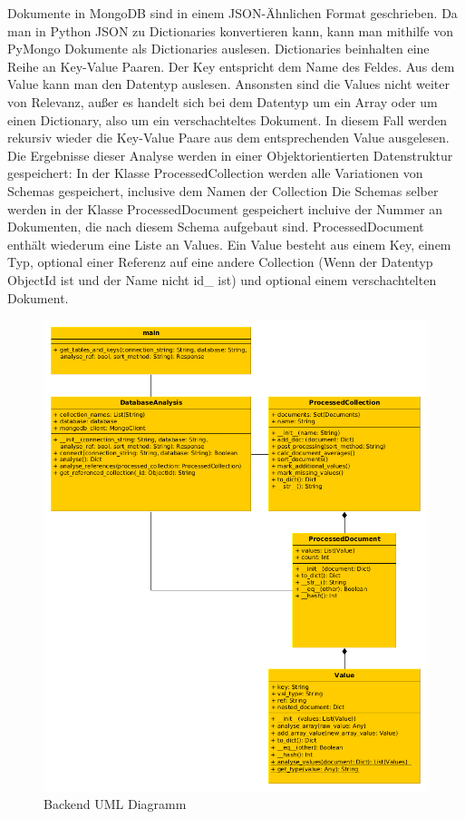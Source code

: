Dokumente in MongoDB sind in einem JSON-Ähnlichen Format geschrieben.
Da man in Python JSON zu Dictionaries konvertieren kann, kann man mithilfe von PyMongo Dokumente als Dictionaries auslesen.
Dictionaries beinhalten eine Reihe an Key-Value Paaren.
Der Key entspricht dem Name des Feldes.
Aus dem Value kann man den Datentyp auslesen.
Ansonsten sind die Values nicht weiter von Relevanz, außer es handelt sich bei dem Datentyp um ein Array oder um einen Dictionary, also um ein verschachteltes Dokument.
In diesem Fall werden rekursiv wieder die Key-Value Paare aus dem entsprechenden Value ausgelesen. 
Die Ergebnisse dieser Analyse werden in einer Objektorientierten Datenstruktur gespeichert:
In der Klasse ProcessedCollection werden alle Variationen von Schemas gespeichert, inclusive dem Namen der Collection 
Die Schemas selber werden in der Klasse ProcessedDocument gespeichert incluive der Nummer an Dokumenten, die nach diesem Schema aufgebaut sind.
ProcessedDocument enthält wiederum eine Liste an Values.
Ein Value besteht aus einem Key, einem Typ, optional einer Referenz auf eine andere Collection (Wenn der Datentyp ObjectId ist und der Name nicht id\_ ist) und optional einem verschachtelten Dokument.

\begin{figure}[H]
    \includegraphics[width=\textwidth]{images/backend_uml}
    \caption{Backend UML Diagramm}
    \label{fig:backend_uml}
\end{figure}

